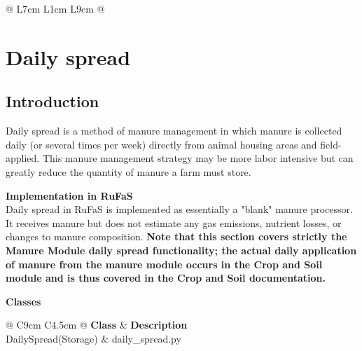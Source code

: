 \begin{refsection}
\begin{longtable}{@{} L{7cm} L{1cm} L{9cm} @{}}
\end{longtable}
\vspace{-0.2cm} 


\newpage
\section{Daily spread}

\subsection{Introduction} 
\vspace{0.2cm}

Daily spread is a method of manure management in which manure is collected daily (or several times per week) directly from animal housing areas and field-applied. This manure management strategy may be more labor intensive but can greatly reduce the quantity of manure a farm must store. 

\vspace{0.2cm}
    
\textbf{Implementation in RuFaS}\\
Daily spread in RuFaS is implemented as essentially a "blank" manure processor. It receives manure but does not estimate any gas emissions, nutrient losses, or changes to manure composition. \textbf{Note that this section covers strictly the Manure Module daily spread functionality; the actual daily application of manure from the manure module occurs in the Crop and Soil module and is thus covered in the Crop and Soil documentation.}

    \vspace{0.2cm}

    \textbf{Classes}
        \begin{table}[h!]
    \centering
    \renewcommand{\arraystretch}{1.3}
    \caption{List of classes for daily spread.}

    \begin{tabular}{@{} C{9cm} C{4.5cm}  @{}}
    \toprule
    \textbf{Class} & \textbf{Description}   \\
    \midrule
DailySpread(Storage) & daily\_spread.py  \\


\end{tabular}
\end{table}
\end{refsection}

